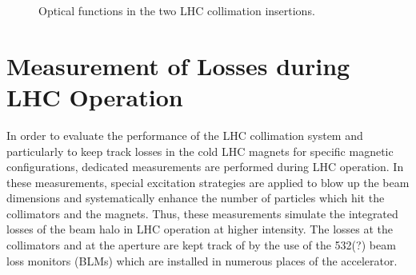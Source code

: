 



%    

\begin{figure}
\centering
\resizebox{1.0\textwidth}{!}{}
\resizebox{1.0\textwidth}{!}{}
\caption{Optical functions in the two LHC collimation insertions.}
\label{pic:14121222}
\end{figure}



\section{Measurement of Losses during LHC Operation}
In order to evaluate the performance of the LHC collimation system and particularly to keep track losses in the cold LHC magnets for specific magnetic configurations, dedicated measurements are performed during LHC operation. In these measurements, special excitation strategies are applied to blow up the beam dimensions and systematically enhance the number of particles which hit the collimators and the magnets. Thus, these measurements simulate the integrated losses of the beam halo in LHC operation at higher intensity. The losses at the collimators and at the aperture are kept track of by the use of the 532(?) beam loss monitors (BLMs) which are installed in numerous places of the accelerator. 


